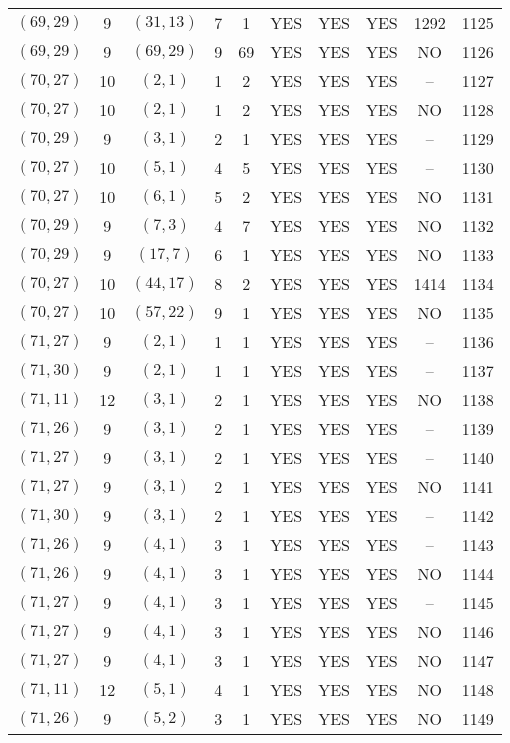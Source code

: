 \begin{longtable}{|c|c|c|c|c|c|c|c|c|c|}
$(69, 29)$ & 9 & $(31, 13)$ & 7 & 1 & YES & YES & YES & 1292 & 1125\\
$(69, 29)$ & 9 & $(69, 29)$ & 9 & 69 & YES & YES & YES & NO & 1126\\
$(70, 27)$ & 10 & $(2, 1)$ & 1 & 2 & YES & YES & YES & -- & 1127\\
$(70, 27)$ & 10 & $(2, 1)$ & 1 & 2 & YES & YES & YES & NO & 1128\\
$(70, 29)$ & 9 & $(3, 1)$ & 2 & 1 & YES & YES & YES & -- & 1129\\
$(70, 27)$ & 10 & $(5, 1)$ & 4 & 5 & YES & YES & YES & -- & 1130\\
$(70, 27)$ & 10 & $(6, 1)$ & 5 & 2 & YES & YES & YES & NO & 1131\\
$(70, 29)$ & 9 & $(7, 3)$ & 4 & 7 & YES & YES & YES & NO & 1132\\
$(70, 29)$ & 9 & $(17, 7)$ & 6 & 1 & YES & YES & YES & NO & 1133\\
$(70, 27)$ & 10 & $(44, 17)$ & 8 & 2 & YES & YES & YES & 1414 & 1134\\
$(70, 27)$ & 10 & $(57, 22)$ & 9 & 1 & YES & YES & YES & NO & 1135\\
$(71, 27)$ & 9 & $(2, 1)$ & 1 & 1 & YES & YES & YES & -- & 1136\\
$(71, 30)$ & 9 & $(2, 1)$ & 1 & 1 & YES & YES & YES & -- & 1137\\
$(71, 11)$ & 12 & $(3, 1)$ & 2 & 1 & YES & YES & YES & NO & 1138\\
$(71, 26)$ & 9 & $(3, 1)$ & 2 & 1 & YES & YES & YES & -- & 1139\\
$(71, 27)$ & 9 & $(3, 1)$ & 2 & 1 & YES & YES & YES & -- & 1140\\
$(71, 27)$ & 9 & $(3, 1)$ & 2 & 1 & YES & YES & YES & NO & 1141\\
$(71, 30)$ & 9 & $(3, 1)$ & 2 & 1 & YES & YES & YES & -- & 1142\\
$(71, 26)$ & 9 & $(4, 1)$ & 3 & 1 & YES & YES & YES & -- & 1143\\
$(71, 26)$ & 9 & $(4, 1)$ & 3 & 1 & YES & YES & YES & NO & 1144\\
$(71, 27)$ & 9 & $(4, 1)$ & 3 & 1 & YES & YES & YES & -- & 1145\\
$(71, 27)$ & 9 & $(4, 1)$ & 3 & 1 & YES & YES & YES & NO & 1146\\
$(71, 27)$ & 9 & $(4, 1)$ & 3 & 1 & YES & YES & YES & NO & 1147\\
$(71, 11)$ & 12 & $(5, 1)$ & 4 & 1 & YES & YES & YES & NO & 1148\\
$(71, 26)$ & 9 & $(5, 2)$ & 3 & 1 & YES & YES & YES & NO & 1149\\

\end{longtable}
